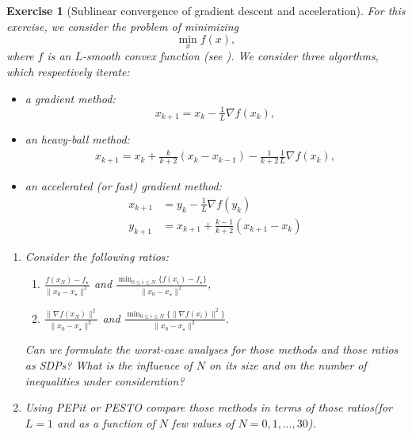 \documentclass[11pt,a4paper]{article}
\newcommand{\pesto}{{PESTO }}
\newcommand{\pepit}{{PEPit }}
\newtheorem{exercise}{Exercise}
\begin{document}
	\begin{exercise}[Sublinear convergence of gradient descent and acceleration]\label{ex:accel1}
	For this exercise, we consider the problem of minimizing
	\[\min_{x} f(x),\]
	where $f$ is an $L$-smooth convex function (see ). We consider three algorthms, which respectively iterate:
	\begin{itemize}
	\item a gradient method:
	\[x_{k+1}=x_k-\tfrac{1}{L} \nabla f(x_k),\]
	\item an heavy-ball method:
	\begin{equation*}
	\begin{aligned}
	x_{k+1}=x_{k}+\tfrac{k}{k+2} (x_{k}-x_{k-1})-\tfrac{1}{k+2}\tfrac{1}{L} \nabla f(x_{k}),
	\end{aligned}
	\end{equation*}
	\item an accelerated (or fast) gradient method:
	\begin{equation*}
	\begin{aligned}
	x_{k+1}&=y_k-\tfrac{1}{L}\nabla f(y_k)\\
	y_{k+1}&=x_{k+1}+\tfrac{k-1}{k+2}(x_{k+1}-x_k)
	\end{aligned}
	\end{equation*}
	\end{itemize}
	\begin{enumerate}
	\item Consider the following ratios:
	\begin{enumerate}
	\item $\frac{f(x_N)-f_\star}{\|x_0-x_\star\|^2}$ and $\frac{\min_{0\leqslant i\leqslant N}\{f(x_i)-f_\star\}}{\|x_0-x_\star\|^2}$,
	\item $\frac{\|\nabla f(x_N)\|^2}{\|x_0-x_\star\|^2}$ and $\frac{\min_{0\leqslant i\leqslant N}\{\|\nabla f(x_i)\|^2\}}{\|x_0-x_\star\|^2}$.
	\end{enumerate}
	Can we formulate the worst-case analyses for those methods and those ratios as SDPs? What is the influence of $N$ on its size and on the number of inequalities under consideration?
	\item Using \pepit or \pesto compare those methods in terms of those ratios(for $L=1$ and as a function of $N$ few values of $N=0,1,\ldots,30$).
	\end{enumerate}
	\end{exercise}	
	
\end{document}
